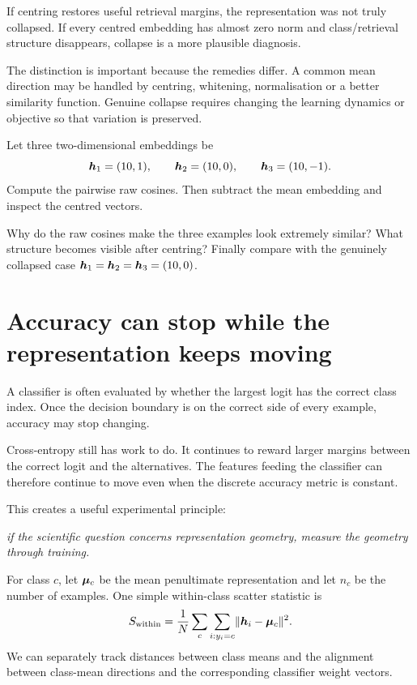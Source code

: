 If centring restores useful retrieval margins, the representation was not truly collapsed. If every centred embedding has almost zero norm and class/retrieval structure disappears, collapse is a more plausible diagnosis.

The distinction is important because the remedies differ. A common mean direction may be handled by centring, whitening, normalisation or a better similarity function. Genuine collapse requires changing the learning dynamics or objective so that variation is preserved.

\begin{optionalexercise}[title={Optional mathematics --- centre before measuring geometry}]
Let three two-dimensional embeddings be
\[
  \bm{h}_1=(10,1),\qquad
  \bm{h}_2=(10,0),\qquad
  \bm{h}_3=(10,-1).
\]
Compute the pairwise raw cosines. Then subtract the mean embedding and inspect the centred vectors.

Why do the raw cosines make the three examples look extremely similar? What structure becomes visible after centring? Finally compare with the genuinely collapsed case \(\bm{h}_1=\bm{h}_2=\bm{h}_3=(10,0)\).
\end{optionalexercise}

\section{Accuracy can stop while the representation keeps moving}

A classifier is often evaluated by whether the largest logit has the correct class index. Once the decision boundary is on the correct side of every example, accuracy may stop changing.

Cross-entropy still has work to do. It continues to reward larger margins between the correct logit and the alternatives. The features feeding the classifier can therefore continue to move even when the discrete accuracy metric is constant.

This creates a useful experimental principle:
\begin{center}
  \emph{if the scientific question concerns representation geometry, measure the geometry through training.}
\end{center}

For class \(c\), let \(\bm{\mu}_c\) be the mean penultimate representation and let \(n_c\) be the number of examples. One simple within-class scatter statistic is
\begin{equation}
  S_{\mathrm{within}}
  = \frac{1}{N}
    \sum_c\sum_{i:y_i=c}
      \lVert \bm{h}_i-\bm{\mu}_c\rVert^2.
  \label{eq:week10-within-scatter}
\end{equation}
We can separately track distances between class means and the alignment between class-mean directions and the corresponding classifier weight vectors.


